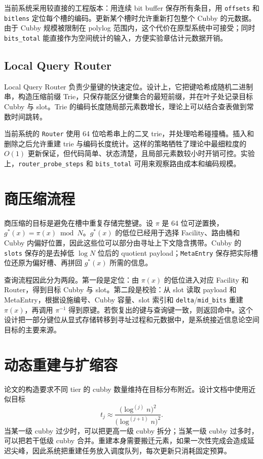 当前系统采用较直接的工程版本：用连续 bit buffer 保存所有条目，用 \texttt{offsets} 和 \texttt{bitlens} 定位每个槽的编码。更新某个槽时允许重新打包整个 Cubby 的元数据。由于 Cubby 规模被限制在 polylog 范围内，这个代价在原型系统中可接受；同时 \texttt{bits\_total} 能直接作为空间统计的输入，方便实验章估计元数据开销。

\subsection{Local Query Router}
Local Query Router 负责少量键的快速定位。设计上，它把键哈希成随机二进制串，构造压缩前缀 Trie，只保存能区分键集合的最短前缀，并在叶子处记录目标 Cubby 与 slot。Trie 的编码长度随局部元素数增长，理论上可以结合查表做到常数时间跳转。

当前系统的 \texttt{Router} 使用 64 位哈希串上的二叉 trie，并处理哈希碰撞桶。插入和删除之后允许重建 trie 与编码长度统计。这样的策略牺牲了理论中最细粒度的 \(O(1)\) 更新保证，但代码简单、状态清楚，且局部元素数较小时开销可控。实验上，\texttt{router\_probe\_steps} 和 \texttt{bits\_total} 可用来观察路由成本和编码规模。

\section{商压缩流程}
商压缩的目标是避免在槽中重复存储完整键。设 \(\pi\) 是 64 位可逆置换，\(g^\ast(x)=\pi(x)\bmod N\)。\(g^\ast(x)\) 的低位已经用于选择 Facility、路由桶和 Cubby 内偏好位置，因此这些位可以部分由寻址上下文隐含携带。Cubby 的 \texttt{slots} 保存的是去掉低 \(\log N\) 位后的 quotient payload；\texttt{MetaEntry} 保存把实际槽位还原为偏好槽、再拼回 \(g^\ast(x)\) 所需的信息。

查询流程因此分为两段。第一段是定位：由 \(\pi(x)\) 的低位进入对应 Facility 和 Router，得到目标 Cubby 与 slot。第二段是校验：从 slot 读取 payload 和 MetaEntry，根据设施编号、Cubby 容量、slot 索引和 \texttt{delta}/\texttt{mid\_bits} 重建 \(\pi(x)\)，再调用 \(\pi^{-1}\) 得到原键。若恢复出的键与查询键一致，则返回命中。这个设计把一部分键位从显式存储转移到寻址过程和元数据中，是系统接近信息论空间目标的主要来源。

\section{动态重建与扩缩容}
论文的构造要求不同 tier 的 cubby 数量维持在目标分布附近。设计文档中使用近似目标
\[
  t_j \approx
  \frac{\bigl(\log^{(j)} n\bigr)^2}
       {\bigl(\log^{(j+1)} n\bigr)^2}.
\]
当某一级 cubby 过少时，可以把更高一级 cubby 拆分；当某一级 cubby 过多时，可以把若干低级 cubby 合并。重建本身需要搬迁元素，如果一次性完成会造成延迟尖峰，因此系统把重建任务放入调度队列，每次更新只消耗固定预算。

